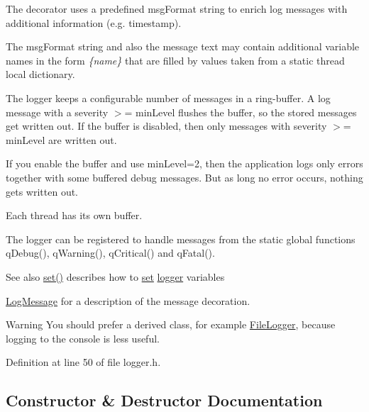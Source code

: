 The decorator uses a predefined msg\+Format string to enrich log messages with additional information (e.\+g. timestamp). 

The msg\+Format string and also the message text may contain additional variable names in the form {\itshape \{name\}} that are filled by values taken from a static thread local dictionary. 

The logger keeps a configurable number of messages in a ring-\/buffer. A log message with a severity $>$= min\+Level flushes the buffer, so the stored messages get written out. If the buffer is disabled, then only messages with severity $>$= min\+Level are written out. 

If you enable the buffer and use min\+Level=2, then the application logs only errors together with some buffered debug messages. But as long no error occurs, nothing gets written out. 

Each thread has it\textquotesingle{}s own buffer. 

The logger can be registered to handle messages from the static global functions q\+Debug(), q\+Warning(), q\+Critical() and q\+Fatal().

\begin{DoxySeeAlso}{See also}
\mbox{\hyperlink{classstefanfrings_1_1_logger_aeec74ca028bceb107a2337c5f6090432}{set()}} describes how to \mbox{\hyperlink{classstefanfrings_1_1_logger_aeec74ca028bceb107a2337c5f6090432}{set}} \mbox{\hyperlink{_logger_8cxx_abdf011b5bac957ec8be241da6fd8581b}{logger}} variables 

\mbox{\hyperlink{classstefanfrings_1_1_log_message}{Log\+Message}} for a description of the message decoration. 
\end{DoxySeeAlso}
\begin{DoxyWarning}{Warning}
You should prefer a derived class, for example \mbox{\hyperlink{classstefanfrings_1_1_file_logger}{File\+Logger}}, because logging to the console is less useful. 
\end{DoxyWarning}


Definition at line 50 of file logger.\+h.



\subsection{Constructor \& Destructor Documentation}
\mbox{\label{classstefanfrings_1_1_logger_a002e7ed636e30aa9fa73bc08b96201d3}} 
